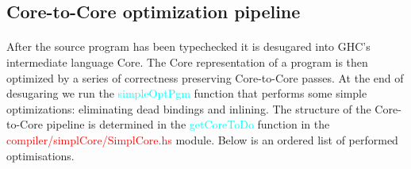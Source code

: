 \documentclass{article}
\begin{document}
	\subsection{Core-to-Core optimization pipeline}
	\paragraph{}
	After the source program has been typechecked it is desugared into GHC's intermediate language Core. The Core representation of a program is then optimized by a series of correctness preserving Core-to-Core passes. At the end of desugaring we run the \textcolor{cyan}{simpleOptPgm} function that performs some simple optimizations: eliminating dead bindings and inlining. The structure of the Core-to-Core pipeline is determined in the \textcolor{cyan}{getCoreToDo} function in the \textcolor{red}{compiler/simplCore/SimplCore.hs} module. Below is an ordered list of performed optimisations.
\end{document}
